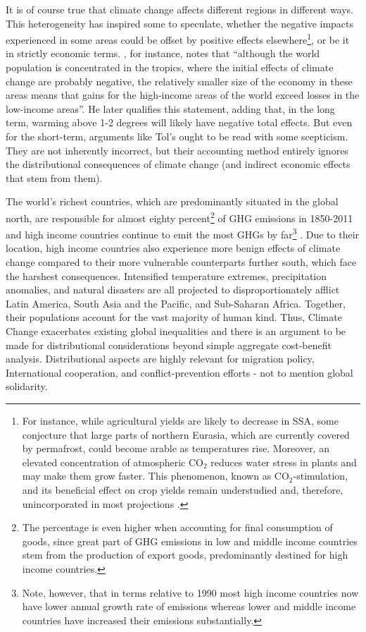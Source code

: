 \documentclass[a4paper,12pt]{article}
\theoremstyle{plain}
\theoremstyle{definition}
\theoremstyle{definition}
\theoremstyle{definition}
\theoremstyle{definition}
\begin{document}
It is of course true that climate change affects different regions in different ways. This heterogeneity has inspired some to speculate, whether the negative impacts experienced in some areas could be offset by positive effects elsewhere\footnote{For instance, while agricultural yields are likely to decrease in SSA, some conjecture that large parts of northern Eurasia, which are currently covered by permafrost, could become arable as temperatures rise. Moreover, an elevated concentration of atmospheric CO$_2$ reduces water stress in plants and may make them grow faster. This phenomenon, known as CO$_2$-stimulation, and its beneficial effect on crop yields remain understudied and, therefore, unincorporated in most projections \citep[e.g., in][]{Schlenker2010}.}, or be it in strictly economic terms. \citet{Tol2009}, for instance, notes that ``although the world population is concentrated in the tropics, where the initial effects of climate change are probably negative, the relatively smaller size of the economy in these areas means that gains for the high-income areas of the world exceed losses in the low-income areas''. He later qualifies this statement, adding that, in the long term, warming above 1-2 degrees will likely have negative total effects. But even for the short-term, arguments like Tol's ought to be read with some scepticism. They are not inherently incorrect, but their accounting method entirely ignores the distributional consequences of climate change (and indirect economic effects that stem from them).

The world's richest countries, which are predominantly situated in  the global north, are responsible for almost eighty percent\footnote{The percentage is even higher when accounting for final consumption of goods, since great part of GHG emissions in low and middle income countries stem from the production of export goods, predominantly destined for high income countries.} of GHG emissions in 1850-2011 and high income countries continue to emit the most GHGs by far\footnote{Note, however, that in terms relative to 1990 most high income countries now have lower annual growth rate of emissions whereas lower and middle income countries have increased their emissions substantially.} \citep{Ritchie2017}. Due to their location, high income countries also experience more benign effects of climate change compared to their more vulnerable counterparts further south, which face the harshest consequences. Intensified temperature extremes, precipitation anomalies, and natural disasters are all projected to disproportionately afflict Latin America, South Asia and the Pacific, and Sub-Saharan Africa. Together, their populations account for the vast majority of human kind. Thus, Climate Change exacerbates existing global inequalities and there is an argument to be made for distributional considerations beyond simple aggregate cost-benefit analysis. Distributional aspects are highly relevant for migration policy, International cooperation, and conflict-prevention efforts - not to mention global solidarity.
\end{document}
